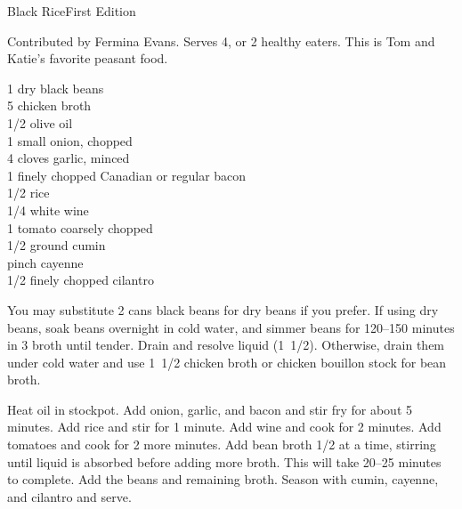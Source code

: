 \begin{entry}{Black Rice}{First Edition}

\begin{open}
  Contributed by Fermina Evans. Serves 4, or 2 healthy eaters. This is Tom and
  Katie's favorite peasant food.
\end{open}
\begin{ingredients}
  \SI{1}{\cup} dry black beans\\
  \SI{5}{\cup} chicken broth\\
  \SI{1/2}{\tblspoon} olive oil \\
  1 small onion, chopped \\
  4 cloves garlic, minced \\
  \SI{1}{\ounce} finely chopped Canadian or regular bacon \\
  \SI{1/2}{\cup} rice \\
  \SI{1/4}{\cup} white wine \\
  1 tomato coarsely chopped \\
  \SI{1/2}{\teaspoon} ground cumin \\
  pinch cayenne \\
  \SI{1/2}{\cup} finely chopped cilantro
\end{ingredients}
You may substitute 2 cans black beans for dry beans if you prefer. If using
dry beans, soak beans overnight in cold water, and simmer beans for
\numrange{120}{150} minutes in \SI{3}{\cup} broth until tender. Drain and
resolve liquid (\SI{1/2}[1]{\cup}). Otherwise, drain them under cold water and
use \SI{1/2}[1]{\cup} chicken broth or chicken bouillon stock for bean broth.

Heat oil in stockpot. Add onion, garlic, and bacon and stir fry for about 5
minutes.  Add rice and stir for 1 minute. Add wine and cook for 2 minutes. Add
tomatoes and cook for 2 more minutes.  Add bean broth \SI{1/2}{\cup} at a
time, stirring until liquid is absorbed before adding more broth. This will
take \numrange{20}{25} minutes to complete. Add the beans and remaining
broth. Season with cumin, cayenne, and cilantro and serve.
\end{entry}

